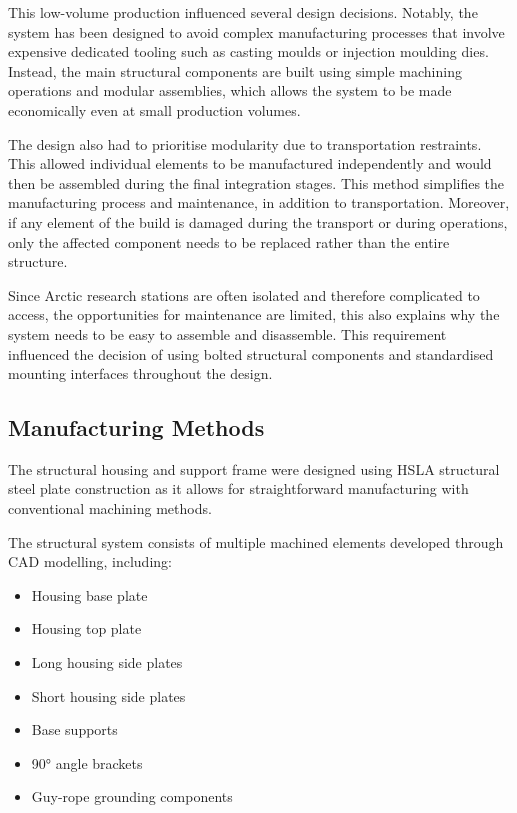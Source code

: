\documentclass[11pt,a4paper]{article}
\begin{document}
This low-volume production influenced several design decisions. Notably, the system has been designed to avoid complex manufacturing processes that involve expensive dedicated tooling such as casting moulds or injection moulding dies. Instead, the main structural components are built using simple machining operations and modular assemblies, which allows the system to be made economically even at small production volumes.

The design also had to prioritise modularity due to transportation restraints. This allowed individual elements to be manufactured independently and would then be assembled during the final integration stages. This method simplifies the manufacturing process and maintenance, in addition to transportation. Moreover, if any element of the build is damaged during the transport or during operations, only the affected component needs to be replaced rather than the entire structure.

Since Arctic research stations are often isolated and therefore complicated to access, the opportunities for maintenance are limited, this also explains why the system needs to be easy to assemble and disassemble. This requirement influenced the decision of using bolted structural components and standardised mounting interfaces throughout the design. 

\subsection{Manufacturing Methods}
The structural housing and support frame were designed using HSLA structural steel plate construction as it allows for straightforward manufacturing with conventional machining methods. 

The structural system consists of multiple machined elements developed through CAD modelling, including:

\begin{itemize}
\item Housing base plate
\item Housing top plate
\item Long housing side plates
\item Short housing side plates
\item Base supports
\item 90° angle brackets
\item Guy-rope grounding components
\end{itemize}

\medskip
\end{document}
